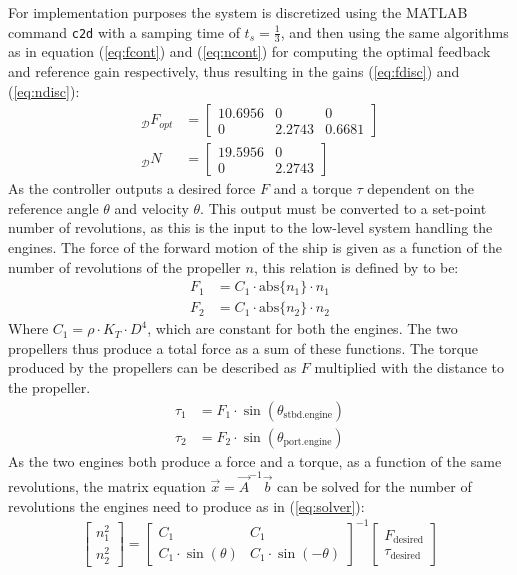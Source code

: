 \documentclass{ifacconf}
\begin{document}
For implementation purposes the system is discretized using the MATLAB command \texttt{c2d} with a samping time of $t_s = \frac{1}{3}$, and then using the same algorithms as in equation (\ref{eq:fcont}) and (\ref{eq:ncont}) for computing the optimal feedback and reference gain respectively, thus resulting in the gains (\ref{eq:fdisc}) and (\ref{eq:ndisc}):
\begin{align}
_\mathcal{D}F_{opt} &= \begin{bmatrix}
10.6956 & 0 & 0\\
0 & 2.2743 & 0.6681
\end{bmatrix}\label{eq:fdisc}\\
_\mathcal{D}N &=  \begin{bmatrix}
19.5956 & 0\\
0 & 2.2743
\end{bmatrix}\label{eq:ndisc}
\end{align}
As the controller outputs a desired force $F$ and a torque $\tau$ dependent on the reference angle $\theta$ and velocity $\theta$. This output must be converted to a set-point number of revolutions, as this is the input to the low-level system handling the engines. The force of the forward motion of the ship is given as a function of the number of revolutions of the propeller $n$, this relation is defined by \cite{cyber} to be:
\begin{align}
F_1 &= C_1 \cdot \text{abs}\{n_1\} \cdot n_1\\
F_2 &= C_1 \cdot \text{abs}\{n_2\} \cdot n_2
\end{align}
Where $C_1 = \rho \cdot K_T \cdot D^4$, which are constant for both the engines. The two propellers thus produce a total force as a sum of these functions. The torque produced by the propellers can be described as $F$ multiplied with the distance to the propeller.
\begin{align}
\tau_1 &= F_1 \cdot \sin(\theta_\text{stbd.engine})\\
\tau_2 &= F_2 \cdot \sin(\theta_\text{port.engine})
\end{align}
As the two engines both produce a force and a torque, as a function of the same revolutions, the matrix equation $\vec{x} = \vec{A}^{-1}\vec{b}$ can be solved for the number of revolutions the engines need to produce as in (\ref{eq:solver}):
\begin{align}
\begin{bmatrix}
n_1^2\\
n_2^2
\end{bmatrix} = \begin{bmatrix}
C_1 & C_1\\
C_1 \cdot \sin(\theta) & C_1 \cdot \sin(-\theta)
\end{bmatrix}^{-1}\begin{bmatrix}
F_\text{desired}\\
\tau_\text{desired}
\end{bmatrix}\label{eq:solver}
\end{align}
\end{document}
